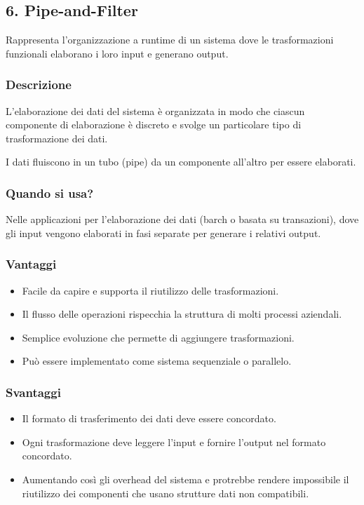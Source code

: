 \documentclass{report}
\begin{document}
\subsection*{6. Pipe-and-Filter}
Rappresenta l'organizzazione a runtime di un sistema dove le trasformazioni funzionali elaborano i loro input e generano output.

\subsubsection*{Descrizione}
L'elaborazione dei dati del sistema è organizzata in modo che ciascun componente di elaborazione è discreto e svolge un particolare tipo di trasformazione dei dati.

\noindent
I dati fluiscono in un tubo (pipe) da un componente all'altro per essere elaborati.

\subsubsection*{Quando si usa?}
Nelle applicazioni per l'elaborazione dei dati (barch o basata su transazioni), dove gli input vengono elaborati in fasi separate per generare i relativi output.

\begin{multicols}{2}

    \subsubsection*{Vantaggi}
    \begin{itemize}
        \item Facile da capire e supporta il riutilizzo delle trasformazioni.
        \item Il flusso delle operazioni rispecchia la struttura di molti processi aziendali.
        \item Semplice evoluzione che permette di aggiungere trasformazioni.
        \item Può essere implementato come sistema sequenziale o parallelo.
    \end{itemize}
    
    \columnbreak
    
    \subsubsection*{Svantaggi}
    \begin{itemize}
        \item Il formato di trasferimento dei dati deve essere concordato.
        \item Ogni trasformazione deve leggere l'input e fornire l'output nel formato concordato.
        \item Aumentando così gli overhead del sistema e protrebbe rendere impossibile il riutilizzo dei componenti che usano strutture dati non compatibili.
    \end{itemize}
    
\end{multicols}
\end{document}
